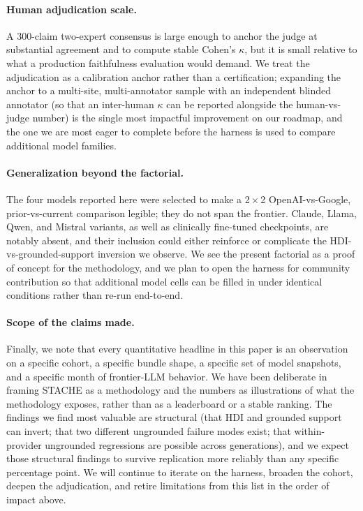 \documentclass[11pt]{article}
\begin{document}
\paragraph{Human adjudication scale.} A 300-claim two-expert consensus is large enough to anchor the judge at substantial agreement and to compute stable Cohen's $\kappa$, but it is small relative to what a production faithfulness evaluation would demand. We treat the adjudication as a calibration anchor rather than a certification; expanding the anchor to a multi-site, multi-annotator sample with an independent blinded annotator (so that an inter-human $\kappa$ can be reported alongside the human-vs-judge number) is the single most impactful improvement on our roadmap, and the one we are most eager to complete before the harness is used to compare additional model families.

\paragraph{Generalization beyond the factorial.} The four models reported here were selected to make a 2\,$\times$\,2 OpenAI-vs-Google, prior-vs-current comparison legible; they do not span the frontier. Claude, Llama, Qwen, and Mistral variants, as well as clinically fine-tuned checkpoints, are notably absent, and their inclusion could either reinforce or complicate the HDI-vs-grounded-support inversion we observe. We see the present factorial as a proof of concept for the methodology, and we plan to open the harness for community contribution so that additional model cells can be filled in under identical conditions rather than re-run end-to-end.

\paragraph{Scope of the claims made.} Finally, we note that every quantitative headline in this paper is an observation on a specific cohort, a specific bundle shape, a specific set of model snapshots, and a specific month of frontier-LLM behavior. We have been deliberate in framing STACHE as a methodology and the numbers as illustrations of what the methodology exposes, rather than as a leaderboard or a stable ranking. The findings we find most valuable are structural (that HDI and grounded support can invert; that two different ungrounded failure modes exist; that within-provider ungrounded regressions are possible across generations), and we expect those structural findings to survive replication more reliably than any specific percentage point. We will continue to iterate on the harness, broaden the cohort, deepen the adjudication, and retire limitations from this list in the order of impact above.
\end{document}
